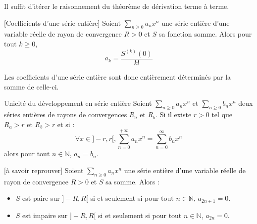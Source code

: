 \documentclass[french,11pt,twoside]{VcCours}
\begin{document}
\begin{Demonstration}{} Il suffit d'itérer le raisonnement du théorème de dérivation terme à terme.
\end{Demonstration}

\begin{Corollaire}{}[Coefficients d'une série entière] Soient $\sum_{n \geq 0} a_n x^n$ une série entière d'une variable réelle de rayon de convergence $R>0$ et $S$ sa fonction somme. Alors pour tout $k \geq 0$,
$$ a_k = \frac{S^{(k)}(0)}{k!}$$
\end{Corollaire}

\begin{Demonstration}{}

\vspace*{ 4cm}
\end{Demonstration}

\begin{Remarque}{} Les coefficients d'une série entière sont donc entièrement déterminés par la somme de celle-ci.
\end{Remarque}

\begin{Theoreme}{Unicité du développement en série entière}
Soient $\sum_{n \geq 0} a_n x^n$ et $\sum_{n \geq 0} b_n x^n$ deux séries entières de rayons de convergences $R_a$ et $R_b$. Si il existe $r>0$ tel que $R_a>r$ et $R_b >r$ et si :
$$ \forall x \in ]-r,r[, \sum_{n=0}^{+ \infty} a_n x^n = \sum_{n=0}^{\infty} b_n x^n$$
alors pour tout $n \in \mathbb{N}$, $a_n=b_n$.
\end{Theoreme}

\begin{Demonstration}{}

    \vspace*{ 4cm}


\end{Demonstration}

\begin{Corollaire}{}[à savoir reprouver] Soient $\sum_{n \geq 0} a_n x^n$ une série entière d'une variable réelle de rayon de convergence $R>0$ et $S$ sa somme. Alors :
\begin{itemize}
\item $S$ est paire sur $]-R,R[$ si et seulement si pour tout $n \in \mathbb{N}$, $a_{2n+1}=0$.
\item $S$ est impaire sur $]-R,R[$ si et seulement si pour tout $n \in \mathbb{N}$, $a_{2n}=0$.
\end{itemize}
\end{Corollaire}
\end{document}
